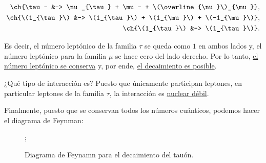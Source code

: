 \documentclass[./../main.tex]{subfiles}
\begin{document}
\begin{exercise}
\begin{solution}
            \begin{align*}
                \ch{\tau- &-> \nu_{\tau} + \mu- + \(\overline{\nu}\)_{\mu}},\\
                \ch{\(1_{\tau}\) &-> \(1_{\tau}\) + \(1_{\mu}\) + \(-1_{\mu}\)},\\
                \ch{\(1_{\tau}\) &-> \(1_{\tau}\)}.\\
            \end{align*}

            Es decir, el número leptónico de la familia \(\tau\) se queda como \(1\) en ambos lados y, el número leptónico para la familia \(\mu\) se hace cero del lado derecho. Por lo tanto, \ul{el número leptónico se conserva} y, por ende, \ul{el decaimiento es posible}. 

            ¿Qué tipo de interacción es? Puesto que únicamente participan leptones, en particular leptones de la familia \(\tau\), la interacción es \ul{nuclear débil}.
            
            Finalmente, puesto que se conservan todos los números cuánticos, podemos hacer el diagrama de Feynman:

            \begin{figure}[htb]
                \centering
                ;
                \caption{Diagrama de Feynamn para el decaimiento del tauón.}
                \label{fig:tauon-decay}
            \end{figure}
        \end{solution}
    \end{exercise}
\end{document}
